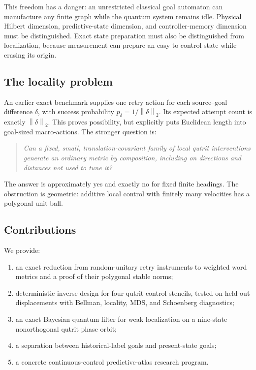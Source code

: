 \documentclass[11pt]{article}
\theoremstyle{definition}\newtheorem{definition}[theorem]{Definition}
\theoremstyle{remark}\newtheorem{remark}[theorem]{Remark}
\newcommand{\norm}[1]{\left\lVert #1\right\rVert}
\begin{document}
This freedom has a danger: an unrestricted classical goal automaton can
manufacture any finite graph while the quantum system remains idle. Physical
Hilbert dimension, predictive-state dimension, and controller-memory
dimension must be distinguished. Exact state preparation must also be
distinguished from localization, because measurement can prepare an
easy-to-control state while erasing its origin.

\subsection{The locality problem}

An earlier exact benchmark supplies one retry action for each source--goal
difference \(\delta\), with success probability
\(p_\delta=1/\norm{\delta}_2\). Its expected attempt count is exactly
\(\norm{\delta}_2\). This proves possibility, but explicitly puts Euclidean
length into goal-sized macro-actions. The stronger question is:
\begin{quote}
\emph{Can a fixed, small, translation-covariant family of local qutrit
interventions generate an ordinary metric by composition, including on
directions and distances not used to tune it?}
\end{quote}
The answer is approximately yes and exactly no for fixed finite headings.
The obstruction is geometric: additive local control with finitely many
velocities has a polygonal unit ball.

\subsection{Contributions}

We provide:
\begin{enumerate}[leftmargin=2em]
\item an exact reduction from random-unitary retry instruments to weighted
word metrics and a proof of their polygonal stable norms;
\item deterministic inverse design for four qutrit control stencils, tested on
held-out displacements with Bellman, locality, MDS, and Schoenberg diagnostics;
\item an exact Bayesian quantum filter for weak localization on a nine-state
nonorthogonal qutrit phase orbit;
\item a separation between historical-label goals and present-state goals;
\item a concrete continuous-control predictive-atlas research program.
\end{enumerate}
\end{document}
